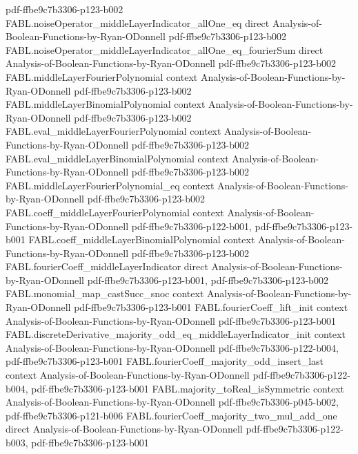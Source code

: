 \begin{theorem}
  {pdf-ffbe9c7b3306-p123-b002}
\proofstep
  {FABL.noiseOperator_middleLayerIndicator_allOne_eq}
  {direct}
  {Analysis-of-Boolean-Functions-by-Ryan-ODonnell}
  {pdf-ffbe9c7b3306-p123-b002}
\proofstep
  {FABL.noiseOperator_middleLayerIndicator_allOne_eq_fourierSum}
  {direct}
  {Analysis-of-Boolean-Functions-by-Ryan-ODonnell}
  {pdf-ffbe9c7b3306-p123-b002}
\proofstep
  {FABL.middleLayerFourierPolynomial}
  {context}
  {Analysis-of-Boolean-Functions-by-Ryan-ODonnell}
  {pdf-ffbe9c7b3306-p123-b002}
\proofstep
  {FABL.middleLayerBinomialPolynomial}
  {context}
  {Analysis-of-Boolean-Functions-by-Ryan-ODonnell}
  {pdf-ffbe9c7b3306-p123-b002}
\proofstep
  {FABL.eval_middleLayerFourierPolynomial}
  {context}
  {Analysis-of-Boolean-Functions-by-Ryan-ODonnell}
  {pdf-ffbe9c7b3306-p123-b002}
\proofstep
  {FABL.eval_middleLayerBinomialPolynomial}
  {context}
  {Analysis-of-Boolean-Functions-by-Ryan-ODonnell}
  {pdf-ffbe9c7b3306-p123-b002}
\proofstep
  {FABL.middleLayerFourierPolynomial_eq}
  {context}
  {Analysis-of-Boolean-Functions-by-Ryan-ODonnell}
  {pdf-ffbe9c7b3306-p123-b002}
\proofstep
  {FABL.coeff_middleLayerFourierPolynomial}
  {context}
  {Analysis-of-Boolean-Functions-by-Ryan-ODonnell}
  {pdf-ffbe9c7b3306-p122-b001,
    pdf-ffbe9c7b3306-p123-b001}
\proofstep
  {FABL.coeff_middleLayerBinomialPolynomial}
  {context}
  {Analysis-of-Boolean-Functions-by-Ryan-ODonnell}
  {pdf-ffbe9c7b3306-p123-b002}
\proofstep
  {FABL.fourierCoeff_middleLayerIndicator}
  {direct}
  {Analysis-of-Boolean-Functions-by-Ryan-ODonnell}
  {pdf-ffbe9c7b3306-p123-b001,
    pdf-ffbe9c7b3306-p123-b002}
\proofstep
  {FABL.monomial_map_castSucc_snoc}
  {context}
  {Analysis-of-Boolean-Functions-by-Ryan-ODonnell}
  {pdf-ffbe9c7b3306-p123-b001}
\proofstep
  {FABL.fourierCoeff_lift_init}
  {context}
  {Analysis-of-Boolean-Functions-by-Ryan-ODonnell}
  {pdf-ffbe9c7b3306-p123-b001}
\proofstep
  {FABL.discreteDerivative_majority_odd_eq_middleLayerIndicator_init}
  {context}
  {Analysis-of-Boolean-Functions-by-Ryan-ODonnell}
  {pdf-ffbe9c7b3306-p122-b004,
    pdf-ffbe9c7b3306-p123-b001}
\proofstep
  {FABL.fourierCoeff_majority_odd_insert_last}
  {context}
  {Analysis-of-Boolean-Functions-by-Ryan-ODonnell}
  {pdf-ffbe9c7b3306-p122-b004,
    pdf-ffbe9c7b3306-p123-b001}
\proofstep
  {FABL.majority_toReal_isSymmetric}
  {context}
  {Analysis-of-Boolean-Functions-by-Ryan-ODonnell}
  {pdf-ffbe9c7b3306-p045-b002,
    pdf-ffbe9c7b3306-p121-b006}
\proofstep
  {FABL.fourierCoeff_majority_two_mul_add_one}
  {direct}
  {Analysis-of-Boolean-Functions-by-Ryan-ODonnell}
  {pdf-ffbe9c7b3306-p122-b003,
    pdf-ffbe9c7b3306-p123-b001}

\end{theorem}
